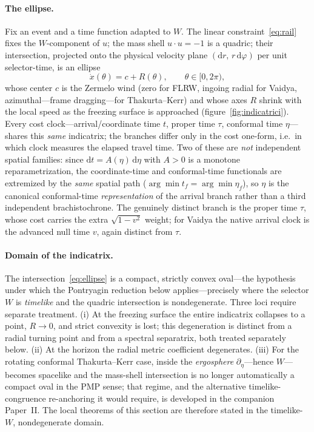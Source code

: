 \documentclass[12pt]{iopart}
\newcommand{\dd}{\mathrm{d}}
\begin{document}
\paragraph{The ellipse.} Fix an event and a time function adapted to $W$. The
linear constraint~\eqref{eq:rail} fixes the $W$-component of $u$; the mass shell
$u\cdot u=-1$ is a quadric; their intersection, projected onto the physical
velocity plane $(\dd r,\,r\,\dd\varphi)$ per unit selector-time, is an ellipse
\begin{equation}
    \dot x(\theta)=c+R(\theta),\qquad \theta\in[0,2\pi),
    \label{eq:ellipse}
\end{equation}
whose center $c$ is the Zermelo wind (zero for FLRW, ingoing radial for Vaidya,
azimuthal---frame dragging---for Thakurta--Kerr) and whose axes $R$ shrink with
the local speed as the freezing surface is approached (figure~\ref{fig:indicatrici}).
Every cost clock---arrival/coordinate time $t$, proper time $\tau$, conformal time
$\eta$---shares this \emph{same} indicatrix; the branches differ only in the cost
one-form, i.e.\ in which clock measures the elapsed travel time. Two of these are
\emph{not} independent spatial families: since $\dd t=A(\eta)\,\dd\eta$ with $A>0$ is
a monotone reparametrization, the coordinate-time and conformal-time functionals are
extremized by the \emph{same} spatial path ($\arg\min t_f=\arg\min\eta_f$), so $\eta$
is the canonical conformal-time \emph{representation} of the arrival branch rather
than a third independent brachistochrone. The genuinely distinct branch is the proper
time $\tau$, whose cost carries the extra $\sqrt{1-v^2}$ weight; for Vaidya the native
arrival clock is the advanced null time $v$, again distinct from $\tau$.

\paragraph{Domain of the indicatrix.} The intersection~\eqref{eq:ellipse} is a
compact, strictly convex oval---the hypothesis under which the Pontryagin reduction
below applies---precisely where the selector $W$ is \emph{timelike} and the quadric
intersection is nondegenerate. Three loci require separate treatment. (i) At the
freezing surface the entire indicatrix collapses to a point, $R\to0$, and strict
convexity is lost; this degeneration is distinct from a radial turning point and
from a spectral separatrix, both treated separately below. (ii) At the horizon the
radial metric coefficient degenerates. (iii) For the rotating conformal
Thakurta--Kerr case, inside the \emph{ergosphere} $\partial_\eta$---hence
$W$---becomes spacelike and the mass-shell intersection is no longer automatically a
compact oval in the PMP sense; that regime, and the alternative timelike-congruence
re-anchoring it would require, is developed in the companion Paper~II. The local
theorems of this section are therefore stated in the timelike-$W$, nondegenerate
domain.
\end{document}
